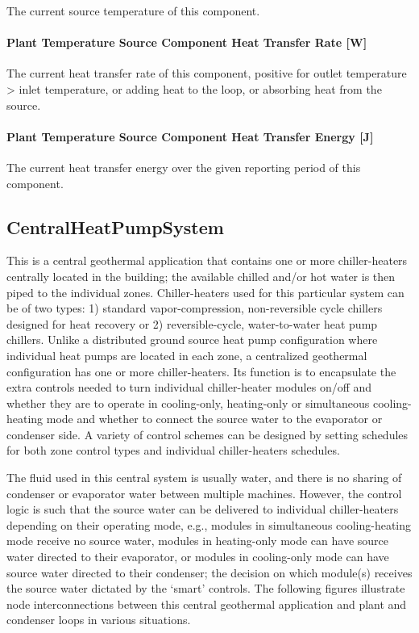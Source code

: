 The current source temperature of this component.

\paragraph{Plant Temperature Source Component Heat Transfer Rate {[}W{]}}\label{plant-temperature-source-component-heat-transfer-rate-w}

The current heat transfer rate of this component, positive for outlet temperature \textgreater{} inlet temperature, or adding heat to the loop, or absorbing heat from the source.

\paragraph{Plant Temperature Source Component Heat Transfer Energy {[}J{]}}\label{plant-temperature-source-component-heat-transfer-energy-j}

The current heat transfer energy over the given reporting period of this component.

\subsection{CentralHeatPumpSystem}\label{centralheatpumpsystem}

This is a central geothermal application that contains one or more chiller-heaters centrally located in the building; the available chilled and/or hot water is then piped to the individual zones. Chiller-heaters used for this particular system can be of two types: 1) standard vapor-compression, non-reversible cycle chillers designed for heat recovery or 2) reversible-cycle, water-to-water heat pump chillers. Unlike a distributed ground source heat pump configuration where individual heat pumps are located in each zone, a centralized geothermal configuration has one or more chiller-heaters. Its function is to encapsulate the extra controls needed to turn individual chiller-heater modules on/off and whether they are to operate in cooling-only, heating-only or simultaneous cooling-heating mode and whether to connect the source water to the evaporator or condenser side. A variety of control schemes can be designed by setting schedules for both zone control types and individual chiller-heaters schedules.

The fluid used in this central system is usually water, and there is no sharing of condenser or evaporator water between multiple machines. However, the control logic is such that the source water can be delivered to individual chiller-heaters depending on their operating mode, e.g., modules in simultaneous cooling-heating mode receive no source water, modules in heating-only mode can have source water directed to their evaporator, or modules in cooling-only mode can have source water directed to their condenser; the decision on which module(s) receives the source water dictated by the `smart' controls. The following figures illustrate node interconnections between this central geothermal application and plant and condenser loops in various situations.

